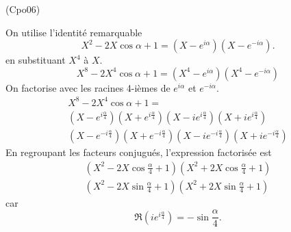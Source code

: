 \begin{tiny}(Cpo06)\end{tiny} On utilise l'identité remarquable
\[
 X^2-2X \cos \alpha + 1 
 = (X-e^{i\alpha})(X-e^{-i\alpha}).
\]
en substituant $X^4$ à $X$.
\[
 X^8 -2X^4\cos \alpha + 1
 = (X^4-e^{i\alpha})(X^4-e^{-i\alpha})
\]
On factorise avec les racines 4-ièmes de $e^{i\alpha}$ et $e^{-i\alpha}$.
\begin{multline*}
 X^8 -2X^4\cos \alpha + 1 = \\
 (X-e^{i\frac{\alpha}{4}})(X+e^{i\frac{\alpha}{4}})(X-ie^{i\frac{\alpha}{4}})(X+ie^{i\frac{\alpha}{4}})\\
 (X-e^{-i\frac{\alpha}{4}})(X+e^{-i\frac{\alpha}{4}})(X-ie^{-i\frac{\alpha}{4}})(X+ie^{-i\frac{\alpha}{4}})
\end{multline*}
En regroupant les facteurs conjugués, l'expression factorisée est
\begin{multline*}
 (X^2-2X\cos\frac{\alpha}{4}+1)(X^2 + 2X\cos\frac{\alpha}{4}+1)\\
 (X^2-2X\sin\frac{\alpha}{4}+1)(X^2 + 2X\sin\frac{\alpha}{4}+1)
\end{multline*}
car
\[
 \Re(ie^{i\frac{\alpha}{4}}) = -\sin\frac{\alpha}{4}.
\]

